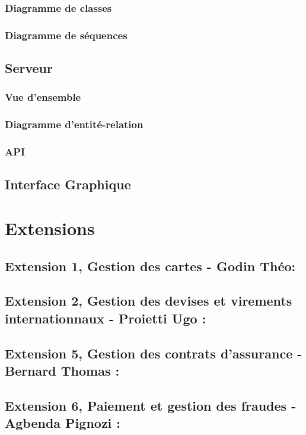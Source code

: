 \documentclass{article}
\begin{document}
				

		\subsubsection{Diagramme de classes}

		\subsubsection{Diagramme de séquences}
	
	\subsection{Serveur}
		\subsubsection{Vue d'ensemble}
		\subsubsection{Diagramme d'entité-relation}
		
		\subsubsection{API}
		
   
    \subsection{Interface Graphique}
	    		

\section{Extensions}
	
	\subsection{Extension 1, Gestion des cartes - Godin Théo: }
	
	\subsection{Extension 2, Gestion des devises et virements internationnaux - Proietti Ugo : }
        
	
	\subsection{Extension 5, Gestion des contrats d'assurance - Bernard Thomas : }
		
	\subsection{Extension 6, Paiement et gestion des fraudes - Agbenda Pignozi : }
		
\end{document}
